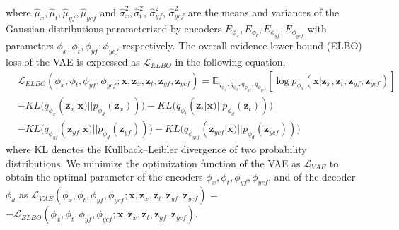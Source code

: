 \documentclass{amia}
\begin{document}
where $\hat{\mu}_x, \hat{\mu}_t, \hat{\mu}_{yf}, \hat{\mu}_{ycf}$ and $\hat{\sigma}_{x}^2, \hat{\sigma}_t^2$, $\hat{\sigma}_{yf}^2$, $\hat{\sigma}_{ycf}^2$ are the means and variances of the Gaussian distributions parameterized by encoders $E_{\phi_x}, E_{\phi_t}, E_{\phi_{yf}}, E_{\phi_{ycf}}$ with parameters $\phi_x, \phi_t, \phi_{yf}, \phi_{ycf}$ respectively.
The overall evidence lower bound (ELBO) loss of the VAE is expressed as $\mathcal{L}_{ELBO}$ in the following equation,
\begin{align*}
    & \mathcal{L}_{ELBO}(\phi_x, \phi_t, \phi_{yf}, \phi_{ycf}; \textbf{x}, \textbf{z}_x, \textbf{z}_t, \textbf{z}_{yf}, \textbf{z}_{ycf}) 
    = \mathbb{E}_{q_{\phi_x}, q_{\phi_t}, q_{\phi_{yf}}, q_{\phi_{ycf}}}[\log p_{\phi_d}(\textbf{x}|\textbf{z}_x, \textbf{z}_t, \textbf{z}_{yf}, \textbf{z}_{ycf})]\\
    & -KL\big(q_{\phi_x}(\textbf{z}_x|\textbf{x}) || p_{\phi_d}(\textbf{z}_x))\big) - KL\big(q_{\phi_t}(\textbf{z}_t|\textbf{x}) || p_{\phi_d}(\textbf{z}_t))\big) \\
    & - KL\big(q_{\phi_{yf}}(\textbf{z}_{yf}|\textbf{x}) || p_{\phi_d}(\textbf{z}_{yf}))\big)  - KL\big(q_{\phi_{ycf}}(\textbf{z}_{ycf}|\textbf{x}) || p_{\phi_d}(\textbf{z}_{ycf}))\big)
\end{align*}
where KL denotes the Kullback–Leibler divergence of two probability distributions. We minimize the optimization function of the VAE as $\mathcal{L}_{VAE}$ to obtain the optimal parameter of the encoders $\phi_x, \phi_t, \phi_{yf}, \phi_{ycf}$, and of the decoder $\phi_d$ as $\mathcal{L}_{VAE}(\phi_x, \phi_t, \phi_{yf}, \phi_{ycf}; \textbf{x}, \textbf{z}_x, \textbf{z}_t, \textbf{z}_{yf}, \textbf{z}_{ycf})$ = $-\mathcal{L}_{ELBO}(\phi_x, \phi_t, \phi_{yf}, \phi_{ycf}; \textbf{x}, \textbf{z}_x, \textbf{z}_t, \textbf{z}_{yf}, \textbf{z}_{ycf})$.
\end{document}
